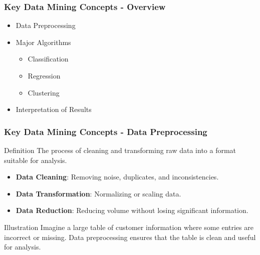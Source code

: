 \documentclass{beamer}
\begin{document}
\begin{frame}[fragile]
    \frametitle{Key Data Mining Concepts - Overview}
    \begin{itemize}
        \item Data Preprocessing
        \item Major Algorithms
            \begin{itemize}
                \item Classification
                \item Regression
                \item Clustering
            \end{itemize}
        \item Interpretation of Results
    \end{itemize}
\end{frame}

\begin{frame}[fragile]
    \frametitle{Key Data Mining Concepts - Data Preprocessing}
    
    \begin{block}{Definition}
        The process of cleaning and transforming raw data into a format suitable for analysis. 
    \end{block}
    
    \begin{itemize}
        \item \textbf{Data Cleaning}: Removing noise, duplicates, and inconsistencies.
        \item \textbf{Data Transformation}: Normalizing or scaling data.
        \item \textbf{Data Reduction}: Reducing volume without losing significant information.
    \end{itemize}
    
    \begin{block}{Illustration}
        Imagine a large table of customer information where some entries are incorrect or missing. Data preprocessing ensures that the table is clean and useful for analysis.
    \end{block}
\end{frame}
\end{document}
